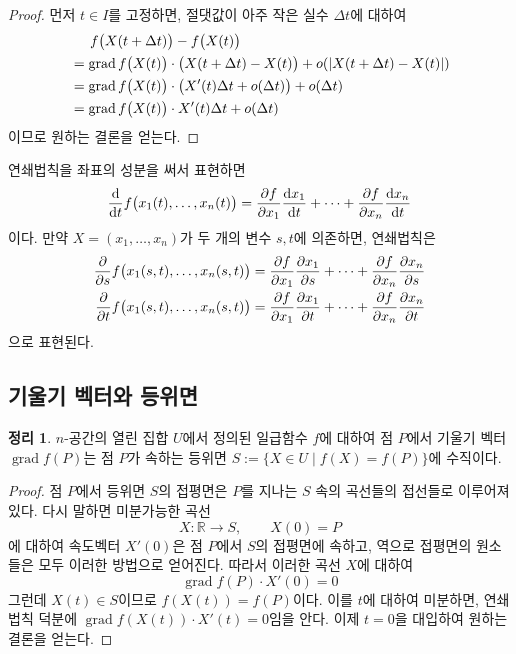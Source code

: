 \documentclass[unfonts,oneside,a4paper]{oblivoir}
\theoremstyle{definition}
\theoremstyle{theorem}
\newtheorem{theorem}{정리}[subsubsection]
\DeclareMathOperator{\grad}{grad}
\begin{document}
\begin{proof}
    먼저 $t \in I$를 고정하면, 절댓값이 아주 작은 실수 $\Delta t$에 대하여
    \begin{align*}
        &\hphantom{=\ \ } f\bigl(X(t + \Delta t)\bigr) - f\bigl(X(t)\bigr)\\
        &= \grad f\bigl(X(t)\bigr) \cdot \bigl(X(t + \Delta t) - X(t)\bigr) + o(|X(t + \Delta t) - X(t)|)\\
        &= \grad f\bigl(X(t)\bigr) \cdot \bigl(X'(t)\Delta t + o(\Delta t)\bigr) + o(\Delta t)\\
        &= \grad f\bigl(X(t)\bigr) \cdot X'(t) \Delta t + o(\Delta t)
    \end{align*}
    이므로 원하는 결론을 얻는다.
\end{proof}

연쇄법칙을 좌표의 성분을 써서 표현하면
\begin{equation*}
    \diff*{f\bigl(x_1(t), \dots, x_n(t)\bigr)}{t} = \diffp{f}{x_1} \diff{x_1}{t} + \dots + \diffp{f}{x_n} \diff{x_n}{t}
\end{equation*}
이다. 만약 $X = (x_1, \dots, x_n)$가 두 개의 변수 $s, t$에 의존하면, 연쇄법칙은
\begin{align*}
    \diffp*{f\bigl(x_1(s, t), \dots, x_n(s, t)\bigr)}{s} &= \diffp{f}{x_1} \diffp{x_1}{s} + \dots + \diffp{f}{x_n} \diffp{x_n}{s}\\
    \diffp*{f\bigl(x_1(s, t), \dots, x_n(s, t)\bigr)}{t} &= \diffp{f}{x_1} \diffp{x_1}{t} + \dots + \diffp{f}{x_n} \diffp{x_n}{t}
\end{align*}
으로 표현된다.

\subsection{기울기 벡터와 등위면}

\begin{theorem}
    $n$-공간의 열린 집합 $U$에서 정의된 일급함수 $f$에 대하여 점 $P$에서 기울기 벡터 $\grad f(P)$는 점 $P$가 속하는 등위면 $S := \{X \in U \mid f(X) = f(P)\}$에 수직이다.
\end{theorem}

\begin{proof}
    점 $P$에서 등위면 $S$의 접평면은 $P$를 지나는 $S$ 속의 곡선들의 접선들로 이루어져 있다.
    다시 말하면 미분가능한 곡선
    \begin{equation*}
        X: \mathbb R \rightarrow S, \qquad X(0) = P
    \end{equation*}
    에 대하여 속도벡터 $X'(0)$은 점 $P$에서 $S$의 접평면에 속하고, 역으로 접평면의 원소들은 모두 이러한 방법으로 얻어진다.
    따라서 이러한 곡선 $X$에 대하여
    \begin{equation*}
        \grad f(P) \cdot X'(0) = 0
    \end{equation*}
    그런데 $X(t) \in S$이므로 $f(X(t)) = f(P)$이다.
    이를 $t$에 대하여 미분하면, 연쇄법칙 덕분에 $\grad f(X(t)) \cdot X'(t) = 0$임을 안다.
    이제 $t = 0$을 대입하여 원하는 결론을 얻는다.
\end{proof}
\end{document}
